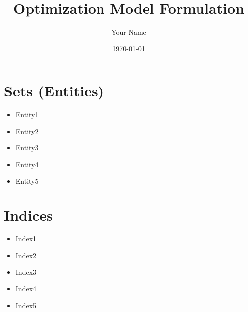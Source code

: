 \documentclass{article}
\title{Optimization Model Formulation}
\author{Your Name}
\date{\today}
\begin{document}
\maketitle
\tableofcontents
\newpage

\section{Sets (Entities)}
\begin{itemize}
    \item Entity1
    \item Entity2
    \item Entity3
    \item Entity4
    \item Entity5
\end{itemize}

\section{Indices}
\begin{itemize}
    \item Index1
    \item Index2
    \item Index3
    \item Index4
    \item Index5
\end{itemize}
\end{document}
